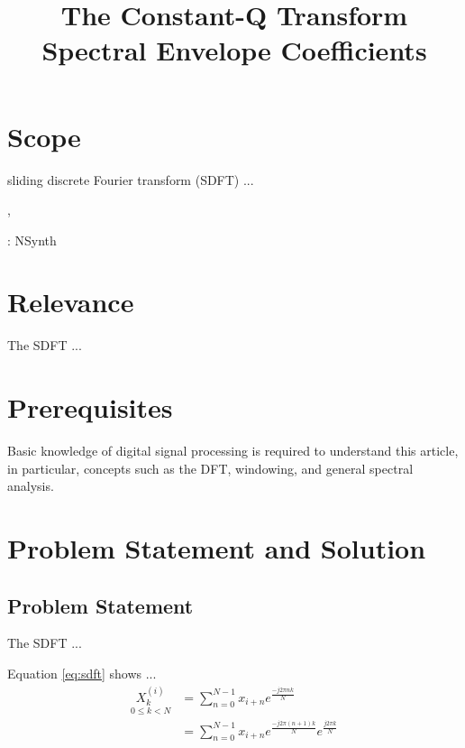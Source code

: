 \documentclass[journal]{IEEEtran}
\begin{document}
\title{The Constant-Q Transform \\ Spectral Envelope Coefficients}

\maketitle


\section{Scope}

 sliding discrete Fourier transform (SDFT) ...


\cite{brown1991}, \cite{brown1992}

\cite{engel2017}: NSynth


\section{Relevance}

The SDFT ...


\section{Prerequisites}

Basic knowledge of digital signal processing is required to understand this article, in particular, concepts such as the DFT, windowing, and general spectral analysis. 


\section{Problem Statement and Solution}

\subsection{Problem Statement}

The SDFT ...

Equation \ref{eq:sdft} shows ...
\begin{equation}
\label{eq:sdft}
\begin{split}
\underset{0 \leq k < N}{X_k^{(i)}} 
& = \sum_{n=0}^{N-1} x_{i+n} e^{\frac{-j 2\pi n k}{N}}\\
& = \sum_{n=0}^{N-1} x_{i+n} e^{\frac{-j 2\pi (n+1) k}{N}} e^{\frac{j 2\pi k}{N}} 
\end{split}
\end{equation}
\end{document}

